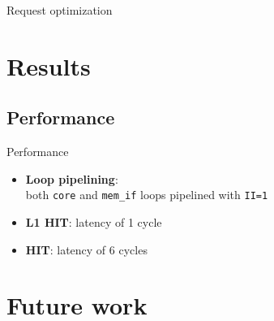 \documentclass{beamer}
\begin{document}
\begin{frame}{Request optimization}
\begin{minipage}{.28\textwidth}
\begin{center}
		\end{center}
	\end{minipage}
\end{frame}
\section{Results}
\subsection{Performance}
\begin{frame}{Performance}
	\begin{itemize}
		\item \textbf{Loop pipelining}:\\ both \texttt{core} and
			\texttt{mem\_if} loops pipelined with \texttt{II=1}
		\item \textbf{L1 HIT}: latency of 1 cycle
		\item \textbf{HIT}: latency of 6 cycles
	\end{itemize}
\end{frame}
\section{Future work}
\end{document}
